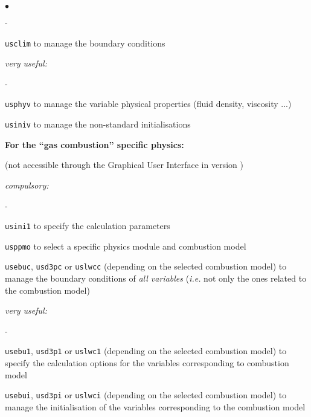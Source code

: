 {{{\begin{list}{$\bullet$}{}
\begin{list}{}{}
\begin{list}{}{}
\begin{list}{-}{}
            \item \texttt{usclim} to manage the boundary conditions
        \end{list}

        \item {\em  very useful:}
        \begin{list}{-}{}
            \item \texttt{usphyv} to manage the variable physical
                  properties (fluid density, viscosity ...)

            \item \texttt{usiniv} to manage the non-standard initialisations
        \end{list}
    \end{list}

  \item{\bf For the ``gas combustion'' specific physics:}

(not accessible through the Graphical User Interface in version \verscs)
    \begin{list}{}{}
        \item {\em compulsory:}
        \begin{list}{-}{}
            \item \texttt{usini1} to specify the calculation parameters

            \item \texttt{usppmo} to select a specific physics module and
               combustion model

            \item \texttt{usebuc}, \texttt{usd3pc} or \texttt{uslwcc}
                  (depending on the selected combustion model) to manage the
                  boundary conditions of {\em all variables} ({\em i.e.} not only
              the ones related to the combustion model)
        \end{list}

        \item {\em very useful:}
        \begin{list}{-}{}
            \item  \texttt{usebu1}, \texttt{usd3p1} or \texttt{uslwc1}
                   (depending on the selected combustion model)
               to specify the calculation options
                   for the variables
                   corresponding to combustion model

            \item   \texttt{usebui}, \texttt{usd3pi} or \texttt{uslwci}
              (depending on the selected combustion model)
                   to manage the initialisation of the variables
                   corresponding to the combustion model
        \end{list}
    \end{list}


\end{list}
\end{list}}}}
